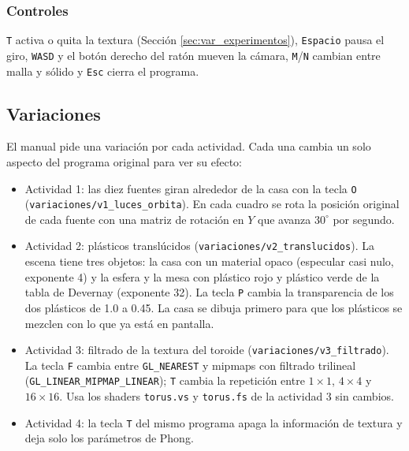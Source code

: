 \subsubsection{Controles}

\texttt{T} activa o quita la textura (Sección \ref{sec:var_experimentos}), \texttt{Espacio} pausa el giro, \texttt{WASD} y el botón derecho del ratón mueven la cámara, \texttt{M}/\texttt{N} cambian entre malla y sólido y \texttt{Esc} cierra el programa.

\subsection{Variaciones}
\label{sec:var_metodologia}

El manual pide una variación por cada actividad. Cada una cambia un solo aspecto del programa original para ver su efecto:

\begin{itemize}
    \item Actividad 1: las diez fuentes giran alrededor de la casa con la tecla \texttt{O} (\texttt{variaciones/v1\_luces\_orbita}). En cada cuadro se rota la posición original de cada fuente con una matriz de rotación en $Y$ que avanza $30^\circ$ por segundo.
    \item Actividad 2: plásticos translúcidos (\texttt{variaciones/v2\_translucidos}). La escena tiene tres objetos: la casa con un material opaco (especular casi nulo, exponente 4) y la esfera y la mesa con plástico rojo y plástico verde de la tabla de Devernay (exponente 32). La tecla \texttt{P} cambia la transparencia de los dos plásticos de 1.0 a 0.45. La casa se dibuja primero para que los plásticos se mezclen con lo que ya está en pantalla.
    \item Actividad 3: filtrado de la textura del toroide (\texttt{variaciones/v3\_filtrado}). La tecla \texttt{F} cambia entre \texttt{GL\_NEAREST} y mipmaps con filtrado trilineal (\texttt{GL\_LINEAR\_MIPMAP\_LINEAR}); \texttt{T} cambia la repetición entre $1\times1$, $4\times4$ y $16\times16$. Usa los shaders \texttt{torus.vs} y \texttt{torus.fs} de la actividad 3 sin cambios.
    \item Actividad 4: la tecla \texttt{T} del mismo programa apaga la información de textura y deja solo los parámetros de Phong.
\end{itemize}
